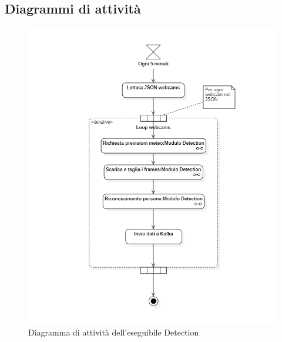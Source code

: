 \subsection{Diagrammi di attività}
\begin{figure}[!h]
  \begin{center}
    \includegraphics[width=1\linewidth]{../immagini/diag_PB/detection.png}
    \caption{Diagramma di attività dell'eseguibile Detection}
  \end{center}
\end{figure}
